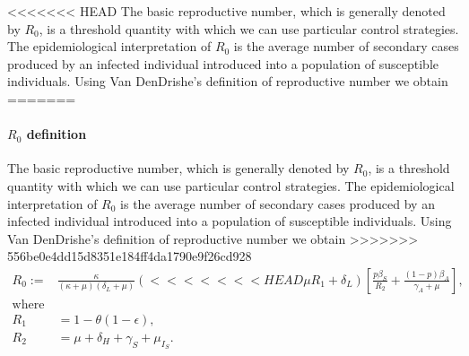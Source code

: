 <<<<<<< HEAD
%
The basic reproductive number, which is generally denoted by $ R_0 $,
is a threshold quantity with which we can use
particular control strategies. The epidemiological interpretation of
$ R_0 $ is the average number of secondary cases produced by an infected
individual introduced into a population of susceptible individuals.
Using Van DenDrishe's \cite{Van2002} definition of reproductive
number we obtain
=======
\paragraph{$R_0$ definition}
%
The basic reproductive number, which is generally denoted by $ R_0 $,
is a threshold quantity with which we can use 
particular control strategies. The epidemiological interpretation of 
$ R_0 $ is the average number of secondary cases produced by an infected
individual introduced into a population of susceptible individuals.
Using Van DenDrishe's \cite{VandenDriessche2017a} definition of reproductive number
we obtain
>>>>>>> 556be0e4dd15d8351e184ff4da1790e9f26cd928
\begin{equation*}
    \label{eqn:reproductive_number}
    \begin{aligned}
        R_0 :=
        &
        \frac{\kappa}{(\kappa + \mu)(\delta_L + \mu)}
        \left(
<<<<<<< HEAD
        \mu R_1 + \delta_L
        \right)
        \left[
        \frac{p\beta_S}{R_2}
        +\frac{(1 - p) \beta_A}{\gamma_A+\mu}
        \right],
        \\
        \text{where} &
        \\
        R_1 &= 1 - \theta(1 - \epsilon),
        \\
        R_2 &= \mu + \delta_H + \gamma_S + \mu_{I_{S}}.
    \end{aligned}
\end{equation*}

